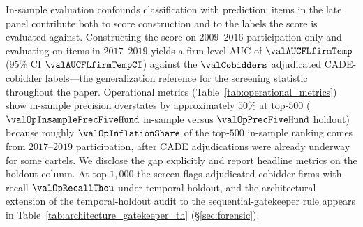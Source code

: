 In-sample evaluation confounds classification with prediction:
items in the late panel contribute both to score construction and
to the labels the score is evaluated against. Constructing the
score on $2009$--$2016$ participation only and evaluating on
items in $2017$--$2019$ yields a firm-level AUC of
$\valAUCFLfirmTemp$ ($95\%$ CI $\valAUCFLfirmTempCI$) against the
$\valCobidders$ adjudicated CADE-cobidder labels---the
generalization reference for the screening statistic throughout
the paper. Operational metrics
(Table~\ref{tab:operational_metrics}) show in-sample precision
overstates by approximately $50\%$ at top-$500$
($\valOpInsamplePrecFiveHund$ in-sample versus
$\valOpPrecFiveHund$ holdout) because roughly
$\valOpInflationShare$ of the top-$500$ in-sample ranking comes
from $2017$--$2019$ participation, after CADE adjudications were
already underway for some cartels. We disclose the gap explicitly
and report headline metrics on the holdout column. At top-$1{,}000$
the screen flags adjudicated cobidder firms with recall
$\valOpRecallThou$ under temporal holdout, and the architectural
extension of the temporal-holdout audit to the
sequential-gatekeeper rule appears in
Table~\ref{tab:architecture_gatekeeper_th} (\S\ref{sec:forensic}).

